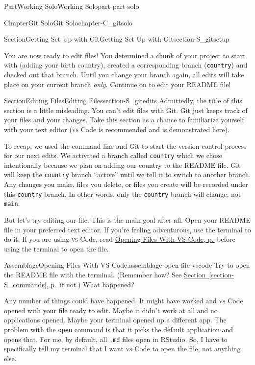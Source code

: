 \documentclass[twoside,10pt,]{book}
\newcommand{\xreffont}{\relax}
\newcommand{\mono}[1]{\texttt{#1}}
\newcommand{\initialism}[1]{\textsc{\MakeLowercase{#1}}}
\DeclareRobustCommand{\initialismintitle}[1]{\texorpdfstring{#1}{#1}}
\begin{document}
\begin{partptx}{Part}{Working Solo}{}{Working Solo}{}{}{part-part-solo}
\begin{chapterptx}{Chapter}{Git Solo}{}{Git Solo}{}{}{chapter-C_gitsolo}
\begin{sectionptx}{Section}{Getting Set Up with Git}{}{Getting Set Up with Git}{}{}{section-S_gitsetup}
\begin{conclusion}{}
You are now ready to edit files! You determined a chunk of your project to start with (adding your birth country), created a corresponding branch (\mono{country}) and checked out that branch. Until you change your branch again, all edits will take place on your current branch \emph{only}. Continue on to edit your README file!%
\end{conclusion}%
\end{sectionptx}
%
%
\typeout{************************************************}
\typeout{************************************************}
%
\begin{sectionptx}{Section}{Editing Files}{}{Editing Files}{}{}{section-S_gitedits}
%
%
%
Admittedly, the title of this section is a little misleading. You can't edit files with Git. Git just keeps track of your files and your changes. Take this section as a chance to familiarize yourself with your text editor (\initialism{VS} Code is recommended and is demonstrated here).%
\par
To recap, we used the command line and Git to start the version control process for our next edits. We activated a branch called \mono{country} which we chose intentionally because we plan on adding our country to the README file. Git will keep the \mono{country} branch ``active'' until we tell it to switch to another branch. Any changes you make, files you delete, or files you create will be recorded under this \mono{country} branch. In other words, only the \mono{country} branch will change, not \mono{main}.%
\par
But let's try editing our file. This is the main goal after all. Open your README file in your preferred text editor. If you're feeling adventurous, use the terminal to do it. If you are using \initialism{VS} Code, read \hyperref[assemblage-open-file-vscode]{Opening Files With \initialismintitle{VS} Code, p.\,\pageref{assemblage-open-file-vscode}} before using the terminal to open the file.%
\begin{assemblage}{Assemblage}{Opening Files With \initialismintitle{VS} Code.}{assemblage-open-file-vscode}%
Try to open the README file with the terminal. (Remember how? See \hyperref[section-S_commands]{Section~{\xreffont\ref{section-S_commands}}, p.\,\pageref{section-S_commands}} if not.) What happened?%
\par
Any number of things could have happened. It might have worked and \initialism{VS} Code opened with your file ready to edit. Maybe it didn't work at all and no applications opened. Maybe your terminal opened up a different app. The problem with the \mono{open} command is that it picks the default application and opens that. For me, by default, all \mono{.md} files open in RStudio. So, I have to specifically tell my terminal that I want \initialism{VS} Code to open the file, not anything else.%

\end{assemblage}
\end{sectionptx}
\end{chapterptx}
\end{partptx}
\end{document}
